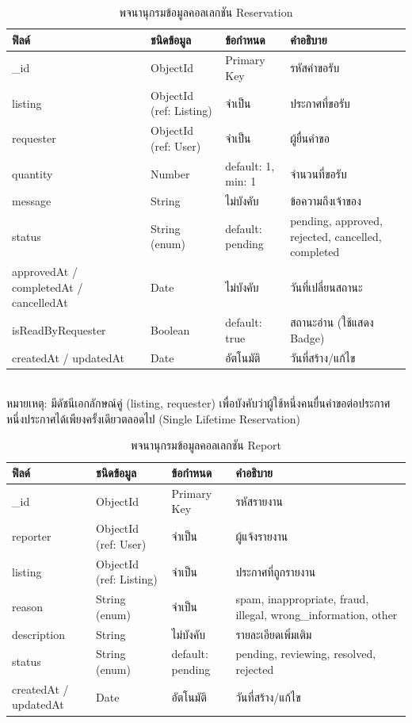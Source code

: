 \documentclass[12pt,a4paper]{report}
\begin{document}
\begin{table}[htbp]
\centering
\caption{พจนานุกรมข้อมูลคอลเลกชัน Reservation}
\label{tab:dd-reservation}
\begin{tabularx}{\textwidth}{>{\raggedright\arraybackslash}p{3.3cm} >{\raggedright\arraybackslash}p{2.5cm} >{\raggedright\arraybackslash}p{2.3cm} X}
\toprule
\textbf{ฟิลด์} & \textbf{ชนิดข้อมูล} & \textbf{ข้อกำหนด} & \textbf{คำอธิบาย}\\
\midrule
\_id & ObjectId & Primary Key & รหัสคำขอรับ\\
listing & ObjectId (ref: Listing) & จำเป็น & ประกาศที่ขอรับ\\
requester & ObjectId (ref: User) & จำเป็น & ผู้ยื่นคำขอ\\
quantity & Number & default: 1, min: 1 & จำนวนที่ขอรับ\\
message & String & ไม่บังคับ & ข้อความถึงเจ้าของ\\
status & String (enum) & default: pending & pending, approved, rejected, cancelled, completed\\
approvedAt / completedAt / cancelledAt & Date & ไม่บังคับ & วันที่เปลี่ยนสถานะ\\
isReadByRequester & Boolean & default: true & สถานะอ่าน (ใช้แสดง Badge)\\
createdAt / updatedAt & Date & อัตโนมัติ & วันที่สร้าง/แก้ไข\\
\bottomrule
\end{tabularx}
\\[0.3em]
\footnotesize หมายเหตุ: มีดัชนีเอกลักษณ์คู่ (listing, requester) เพื่อบังคับว่าผู้ใช้หนึ่งคนยื่นคำขอต่อประกาศหนึ่งประกาศได้เพียงครั้งเดียวตลอดไป (Single Lifetime Reservation)
\end{table}

\begin{table}[htbp]
\centering
\caption{พจนานุกรมข้อมูลคอลเลกชัน Report}
\label{tab:dd-report}
\begin{tabularx}{\textwidth}{>{\raggedright\arraybackslash}p{3.3cm} >{\raggedright\arraybackslash}p{2.5cm} >{\raggedright\arraybackslash}p{2.3cm} X}
\toprule
\textbf{ฟิลด์} & \textbf{ชนิดข้อมูล} & \textbf{ข้อกำหนด} & \textbf{คำอธิบาย}\\
\midrule
\_id & ObjectId & Primary Key & รหัสรายงาน\\
reporter & ObjectId (ref: User) & จำเป็น & ผู้แจ้งรายงาน\\
listing & ObjectId (ref: Listing) & จำเป็น & ประกาศที่ถูกรายงาน\\
reason & String (enum) & จำเป็น & spam, inappropriate, fraud, illegal, wrong\_information, other\\
description & String & ไม่บังคับ & รายละเอียดเพิ่มเติม\\
status & String (enum) & default: pending & pending, reviewing, resolved, rejected\\
createdAt / updatedAt & Date & อัตโนมัติ & วันที่สร้าง/แก้ไข\\
\bottomrule
\end{tabularx}
\end{table}
\end{document}
